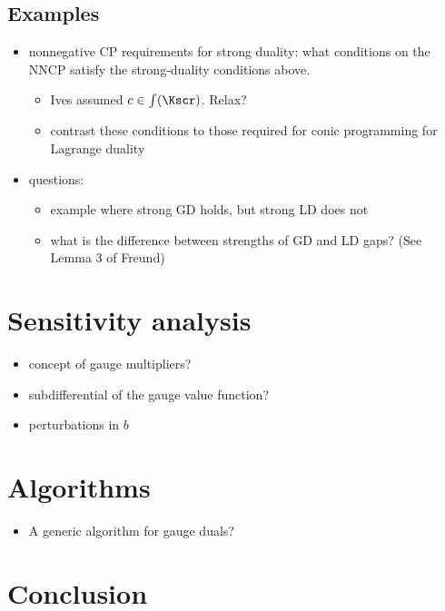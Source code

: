 \documentclass{siamltex}   %
\begin{document}
  \subsection{Examples}
  \begin{itemize}
  \item nonnegative CP requirements for strong duality: what
    conditions on the NNCP satisfy the strong-duality conditions
    above.
    \begin{itemize}
    \item Ives assumed $c \in \int(\Kscr)$. Relax?
    \item contrast these conditions to those required for conic
      programming for Lagrange duality
    \end{itemize}
  \item questions:
    \begin{itemize}
    \item example where strong GD holds, but strong LD does not
    \item what is the difference between strengths of GD and LD
      gaps? (See Lemma 3 of Freund)
    \end{itemize}
  \end{itemize}

  \section{Sensitivity analysis}
  \begin{itemize}
  \item concept of gauge multipliers?
  \item subdifferential of the gauge value function?
  \item perturbations in $b$
  \end{itemize}

  \section{Algorithms}
  \label{sec:algorithms}

  \begin{itemize}
  \item A generic algorithm for gauge duals?
  \end{itemize}




  \section{Conclusion}


  
  
\end{document}
